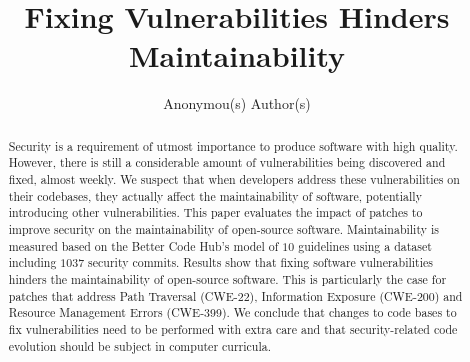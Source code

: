 \documentclass[10pt,conference]{IEEEtran}
\begin{document}
\title{Fixing Vulnerabilities Hinders Maintainability}

\author{
    Anonymou(s) Author(s)

}

\maketitle

\begin{abstract}
Security is a requirement of utmost importance to produce software with 
high quality. However, there is still a considerable amount of 
vulnerabilities being discovered and fixed, almost weekly. We suspect 
that when developers address these vulnerabilities on their codebases, 
they actually affect the maintainability of software, potentially 
introducing other vulnerabilities. This paper evaluates the impact of 
patches to improve security on the maintainability of open-source software. 
Maintainability is measured based on the Better Code Hub’s model of $10$ 
guidelines using a dataset including $1037$ security commits. Results show 
that fixing software vulnerabilities hinders the maintainability of 
open-source software. This is particularly the case for patches that address Path Traversal (CWE-22),
Information Exposure (CWE-200) and Resource Management Errors (CWE-399). 
We conclude that changes to code bases to fix vulnerabilities need to be 
performed with extra care and that security-related code evolution should 
be subject in computer curricula.
\end{abstract}
\end{document}
